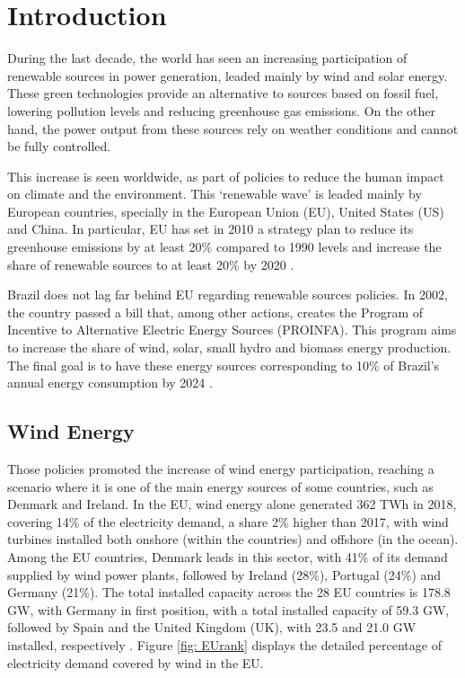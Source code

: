 
\chapter[Introduction]{Introduction}
\label{ch: Intro}

During the last decade, the world has seen an increasing participation of renewable sources in power generation, leaded mainly by wind and solar energy. These green technologies provide an alternative to sources based on fossil fuel, lowering pollution levels and reducing greenhouse gas emissions. On the other hand, the power output from these sources rely on weather conditions and cannot be fully controlled.

This increase is seen worldwide, as part of policies to reduce the human impact on climate and the environment. This `renewable wave' is leaded mainly by European countries, specially in the European Union (EU), United States (US) and China. In particular, EU has set in 2010 a strategy plan to reduce its greenhouse emissions by at least 20\% compared to 1990 levels and increase the share of renewable sources to at least 20\% by 2020 \cite{Europe2020}.

Brazil does not lag far behind EU regarding renewable sources policies. In 2002, the country passed a bill that, among other actions, creates the Program of Incentive to Alternative Electric Energy Sources (PROINFA). This program aims to increase the share of wind, solar, small hydro and biomass energy production. The final goal is to have these energy sources corresponding to 10\% of Brazil's annual energy consumption by 2024 \cite{Brazil2002}.

\section{Wind Energy}

Those policies promoted the increase of wind energy participation, reaching a scenario where it is one of the main energy sources of some countries, such as Denmark and Ireland. In the EU, wind energy alone generated 362 TWh in 2018, covering 14\% of the electricity demand, a share 2\% higher than 2017, with wind turbines installed both onshore (within the countries) and offshore (in the ocean). Among the EU countries, Denmark leads in this sector, with 41\% of its demand supplied by wind power plants, followed by Ireland (28\%), Portugal (24\%) and Germany (21\%). The total installed capacity across the 28 EU countries is 178.8 GW, with Germany in first position, with a total installed capacity of 59.3 GW, followed by Spain and the United Kingdom (UK), with 23.5 and 21.0 GW installed, respectively \cite{WindEurope2019}. Figure \ref{fig: EUrank} displays the detailed percentage of electricity demand covered by wind in the EU.

